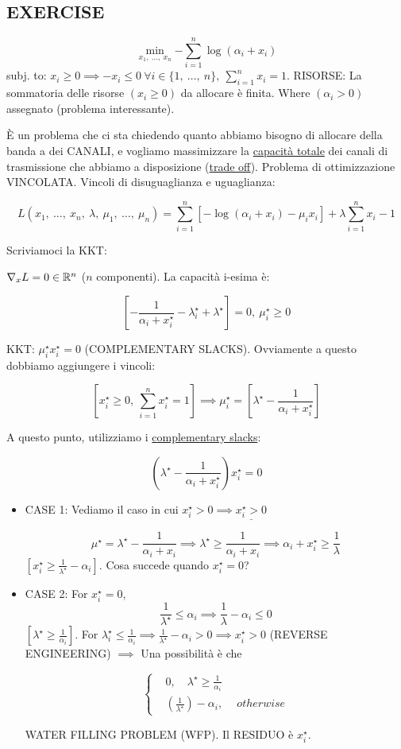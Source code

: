 \subsection{EXERCISE}

\[
	\min_{x_1,\ \dots,\ x_n}{-\sum_{i=1}^n{\log{(\alpha_i+x_i)}}}
\]
subj. to: $x_i\geq 0\implies -x_i\leq 0\ \forall i\in\{1,\ \dots,\ n\},\ \sum_{i=1}^n{x_i} = 1$. RISORSE: La sommatoria delle risorse $(x_i\geq 0)$ da allocare è finita. Where $(\alpha_i>0)$ assegnato (problema interessante). 

\`E un problema che ci sta chiedendo quanto abbiamo bisogno di allocare della banda a dei CANALI, e vogliamo massimizzare la \underline{capacità totale} dei canali di trasmissione che abbiamo a disposizione (\underline{trade off}). Problema di ottimizzazione VINCOLATA. Vincoli di disuguaglianza e uguaglianza:

\[
	L(x_1,\ \dots,\ x_n,\ \lambda,\ \mu_1,\ \dots,\ \mu_n) = \sum_{i=1}^n{[-\log(\alpha_i+x_i) - \mu_ix_i]} + \lambda\sum_{i=1}^n{x_i}-1
\]

Scriviamoci la KKT:

$\nabla_x{L} = 0\in\mathbb{R}^n$ ($n$ componenti). La capacità i-esima è:

\[
	[-\frac{1}{\alpha_i+x_i^\star} -\lambda_i^\star + \lambda^\star] = 0,\ \mu_i^\star\geq 0
\]

KKT: $\mu_i^\star x_i^\star = 0$ (COMPLEMENTARY SLACKS). Ovviamente a questo dobbiamo aggiungere i vincoli:

\[
	[x_i^\star\geq 0,\ \sum_{i=1}^n{x_i^\star} = 1] \implies \mu_i^\star = [\lambda^\star -\frac{1}{\alpha_i+x_i^\star}]
\]

A questo punto, utilizziamo i \underline{complementary slacks}:

\[
	(\lambda^\star - \frac{1}{\alpha_i+x_i^\star})x_i^\star = 0
\]

\begin{itemize}
\item{CASE 1}: Vediamo il caso in cui $x_i^\star > 0 \implies \underline{x_i^\star > 0}$

\[
	\mu^\star = \lambda^\star - \frac{1}{\alpha_i+x_i} \implies \lambda^\star \geq \frac{1}{\alpha_i+x_i} \implies \alpha_i+x_i^\star \geq \frac{1}{\lambda}
\]
$[x_i^\star\geq \frac{1}{\lambda^\star} - \alpha_i]$. Cosa succede quando $x_i^\star=0$?

\item{CASE 2}: For $x_i^\star=0$, 
\[
	\frac{1}{\lambda^\star}\leq\alpha_i\implies\frac{1}{\lambda}-\alpha_i\leq 0
\]
$[\lambda^\star\geq \frac{1}{\alpha_i}]$. For $\lambda_i^\star\leq \frac{1}{\alpha_i} \implies \frac{1}{\lambda^\star}-\alpha_i>0 \implies x_i^\star > 0$ (REVERSE ENGINEERING) $\implies$ Una possibilità è che

\[
	\left\{
	\begin{aligned}
	&0,\quad \lambda^\star\geq\frac{1}{\alpha_i}\\
	&(\frac{1}{\lambda^\star})-\alpha_i,\quad\ otherwise
	\end{aligned}
	\right.
\]

WATER FILLING PROBLEM (WFP). Il RESIDUO è $x_i^\star$.
\end{itemize}


